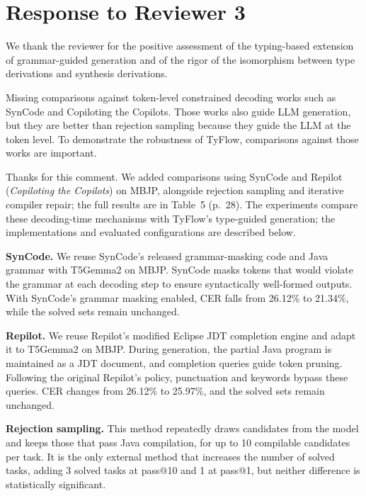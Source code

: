 \documentclass[11pt,a4paper]{article}
\newenvironment{revcomment}[1]{%
  \par\vspace{1.9em}\needspace{5\baselineskip}\noindent{\color{black!30}\hrule height 0.4pt}%
  \smallskip\par\noindent{\bfseries\color{accent}#1}\par\nopagebreak
  \vspace{2pt}%
  \begin{tcolorbox}[enhanced, breakable, frame hidden,
    colback=black!3, borderline west={1.6pt}{0pt}{accent!70},
    left=9pt, right=6pt, top=5pt, bottom=5pt,
    fontupper=\small\itshape, before skip=0pt, after skip=0pt,
    breakable, pad at break*=3pt]\setlength{\parskip}{0.3em}%
}{\end{tcolorbox}}
\newcommand{\response}{\par\medskip\needspace{3\baselineskip}\noindent{\bfseries\color{accent}Response.}%
  \par\nopagebreak\smallskip\ignorespaces}
\begin{document}
\clearpage
\section*{Response to Reviewer 3}

We thank the reviewer for the positive assessment of the typing-based extension of grammar-guided generation and of the rigor of the isomorphism between type derivations and synthesis derivations.

\label{com:3.1}
\begin{revcomment}{Comment 3.1.}
Missing comparisons against token-level constrained decoding works such as
SynCode and Copiloting the Copilots. Those works also guide LLM generation,
but they are better than rejection sampling because they guide the LLM at
the token level. To demonstrate the robustness of TyFlow, comparisons
against those works are important.
\end{revcomment}

\response Thanks for this comment. We added comparisons using SynCode and Repilot (\emph{Copiloting the Copilots}) on MBJP, alongside rejection sampling and iterative compiler repair; the full results are in Table~5 (p.~28). The experiments compare these decoding-time mechanisms with TyFlow's type-guided generation; the implementations and evaluated configurations are described below.

\textbf{SynCode.} We reuse SynCode's released grammar-masking code and Java grammar with T5Gemma2 on MBJP. SynCode masks tokens that would violate the grammar at each decoding step to ensure syntactically well-formed outputs. With SynCode's grammar masking enabled, CER falls from 26.12\% to 21.34\%, while the solved sets remain unchanged.

\textbf{Repilot.} We reuse Repilot's modified Eclipse JDT completion engine and adapt it to T5Gemma2 on MBJP. During generation, the partial Java program is maintained as a JDT document, and completion queries guide token pruning. Following the original Repilot's policy, punctuation and keywords bypass these queries. CER changes from 26.12\% to 25.97\%, and the solved sets remain unchanged.

\textbf{Rejection sampling.} This method repeatedly draws candidates from the model and keeps those that pass Java compilation, for up to 10 compilable candidates per task. It is the only external method that increases the number of solved tasks, adding 3 solved tasks at pass@10 and 1 at pass@1, but neither difference is statistically significant.
\end{document}
